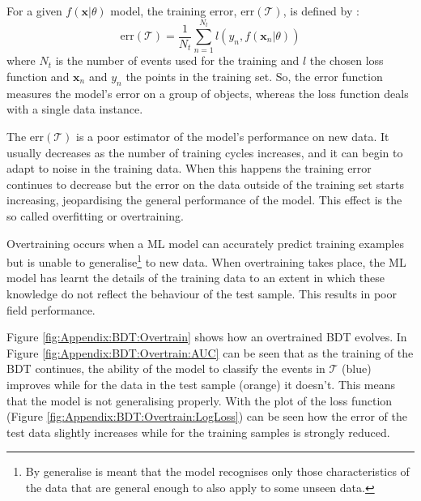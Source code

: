 For a given $f(\bm{x}|\theta)$ model, the training error, $\text{err}(\mathcal{T})$, is defined by 
\cite{zimmermann2006statistical}:
\begin{equation}
\label{eq:Appendix:BDT:ErrorOfTest}
	\text{err}(\mathcal{T}) = \frac{1}{N_t} \sum_{n=1}^{N_t} l(y_{n}, f(\bm{x}_{n}|\theta)) 
\end{equation}
where $N_t$ is the number of events used for the training and $l$ the chosen loss function and
$\bm{x}_n$ and $y_n$ the points in the training set. So, the error function measures the model’s 
error on a group of objects, whereas the loss function deals with a single data instance.

The $\text{err}(\mathcal{T})$ is a poor estimator of the model's performance on new
 data. It usually decreases as the number of training cycles increases, and it can begin 
 to adapt to noise in the training data. When this happens the training error continues to 
 decrease but the error on the data outside of the training set starts increasing, jeopardising
 the general performance of the model. This effect is the so called overfitting or overtraining.
 

Overtraining occurs when a ML model can accurately predict training examples but is 
unable to generalise\footnote{By generalise is meant that the model recognises only 
those characteristics of the data that are general enough to also apply to some unseen data.}
 to new data.  When overtraining takes place, the ML model has learnt
the details of the training data to an extent in which these knowledge do not reflect the 
behaviour of the test sample.  This results in poor field performance. 

Figure \ref{fig:Appendix:BDT:Overtrain} shows how an overtrained BDT evolves. 
In Figure \ref{fig:Appendix:BDT:Overtrain:AUC} can be seen that as the training of the
BDT continues, the ability of the model to classify the events in $\mathcal{T}$ (blue)
improves while for the data in the test sample (orange) it doesn't. This means that
the model is not generalising properly. 
With the plot of the loss function (Figure \ref{fig:Appendix:BDT:Overtrain:LogLoss})
can be seen how the error of the test data slightly increases while for the training
samples is strongly reduced. 


